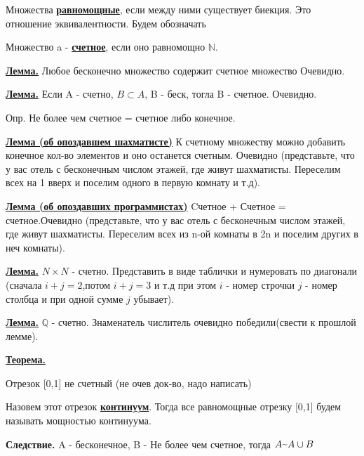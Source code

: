 \documentclass{article}
\newcommand{\deff}[1]{\underline{\textbf{#1}}}
\newcommand{\thmm}[1]{\underline{\textbf{#1}}}
\newcommand{\mytilde}{\raisebox{0.5ex}{\texttildelow}}
\begin{document}
Множества \deff{равномощные}, если между ними существует биекция. Это отношение эквивалентности. Будем обозначать \mytilde

Множество a - \deff{счетное}, если оно равномощно $\mathbb{N}$.

\thmm{Лемма.} Любое бесконечно множество содержит счетное множество Очевидно.

\thmm{Лемма.} Если A - счетно, $B \subset A$, B - беск, тогла B - счетное. Очевидно.

Опр. Не более чем счетное = счетное либо конечное.

\thmm{Лемма (об опоздавшем шахматисте)} К счетному множеству можно добавить конечное кол-во элементов и оно останется счетным. Очевидно (представьте, что у вас отель с бесконечным числом этажей, где живут шахматисты. Переселим всех на 1 вверх и поселим одного в первую комнату и т.д).

\thmm{Лемма (об опоздавших программистах)} Cчетное  + Счетное =  счетное.Очевидно (представьте, что у вас отель с бесконечным числом этажей, где живут шахматисты. Переселим всех из n-ой комнаты в 2n и поселим других в неч комнаты). 

\thmm{Лемма.} $N \times N$ - счетно.  Представить в виде таблички и нумеровать по диагонали (сначала $i+j=2$,потом $i+j=3$ и т.д при этом $i$ - номер строчки $j$ - номер столбца и при одной сумме $j$ убывает). 

\thmm{Лемма.} $\mathbb{Q}$ - счетно. Знаменатель числитель очевидно победили(свести к прошлой лемме).

\thmm{Теорема.} 

Отрезок [0,1] не счетный (не очев док-во, надо написать)

Назовем этот отрезок \deff{континуум}. Тогда все равномощные отрезку [0,1] будем называть мощностью континуума.

\textbf{Следствие.} A - бесконечное, B - Не более чем счетное, тогда $A \mytilde A \cup B $
\end{document}
